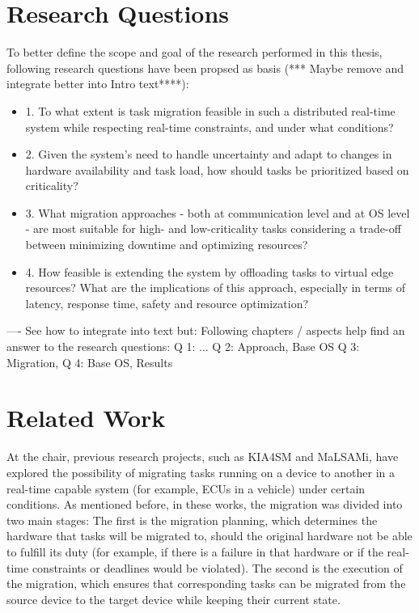 \section*{Research Questions}
To better define the scope and goal of the research performed in this thesis, following research questions have been propsed as basis (*** Maybe remove and integrate better into Intro text****):

\begin{itemize}
	\item 1. To what extent is task migration feasible in such a distributed real-time system while respecting real-time constraints, and under what conditions?
	\item 2. Given the system's need to handle uncertainty and adapt to changes in hardware availability and task load, how should tasks be prioritized based on criticality? 
	\item 3. What migration approaches - both at communication level and at OS level - are most suitable for high- and low-criticality tasks considering a trade-off between minimizing downtime and optimizing resources?
	\item 4. How feasible is extending the system by offloading tasks to virtual edge resources? What are the implications of this approach, especially in terms of latency, response time, safety and resource optimization?
\end{itemize}

---- See how to integrate into text but:
Following chapters / aspects help find an answer to the research questions:
Q 1: ...
Q 2: Approach, Base OS
Q 3: Migration,  
Q 4: Base OS, Results

\section*{Related Work}\label{section:relatedwork}
At the chair, previous research projects, such as KIA4SM and MaLSAMi, have explored the possibility of migrating tasks running on a device to another in a real-time capable system (for example, ECUs in a vehicle) under certain conditions. As mentioned before, in these works, the migration was divided into two main stages: The first is the migration planning, which determines the hardware that tasks will be migrated to, should the original hardware not be able to fulfill its duty (for example, if there is a failure in that hardware or if the real-time constraints or deadlines would be violated). The second is the execution of the migration, which ensures that corresponding tasks can be migrated from the source device to the target device while keeping their current state.

